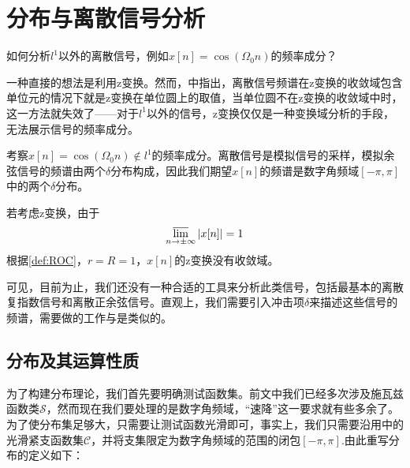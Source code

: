 \section{分布与离散信号分析}\label{sec:Discrete_Convolution}

如何分析$l^1$以外的离散信号，例如$x[n]=\cos(\Omega_0 n)$的频率成分？

一种直接的想法是利用z变换。然而，中指出，离散信号频谱在z变换的收敛域包含单位元的情况下就是z变换在单位圆上的取值，当单位圆不在z变换的收敛域中时，这一方法就失效了——对于$l^1$以外的信号，z变换仅仅是一种变换域分析的手段，无法展示信号的频率成分。

\begin{example}
    考察$x[n]=\cos(\Omega_0 n)\notin l^1$的频率成分。离散信号是模拟信号的采样，模拟余弦信号的频谱由两个$\delta$分布构成，因此我们期望$x[n]$的频谱是数字角频域$[-\pi,\pi]$中的两个$\delta$分布。
    
    若考虑z变换，由于
    $$\varlimsup_{n\to\pm\infty}|x[n]|=1$$
    根据\cref{def:ROC}，$r=R=1$，$x[n]$的z变换没有收敛域。
\end{example}
    
可见，目前为止，我们还没有一种合适的工具来分析此类信号，包括最基本的离散复指数信号和离散正余弦信号。直观上，我们需要引入冲击项$\delta$来描述这些信号的频谱，需要做的工作与是类似的。

\subsection{分布及其运算性质}

为了构建分布理论，我们首先要明确测试函数集。前文中我们已经多次涉及施瓦兹函数类$\mathcal{S}$，然而现在我们要处理的是数字角频域，“速降”这一要求就有些多余了。为了使分布集足够大，只需要让测试函数光滑即可，事实上，我们只需要沿用中的光滑紧支函数集$\mathcal{C}$，并将支集限定为数字角频域的范围的闭包$[-\pi,\pi]$.由此重写分布的定义如下：

